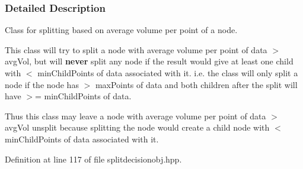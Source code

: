 \subsubsection{\-Detailed \-Description}
\-Class for splitting based on average volume per point of a node. 

\-This class will try to split a node with average volume per point of data $>$ avg\-Vol, but will {\bfseries never} split any node if the result would give at least one child with $<$ min\-Child\-Points of data associated with it. i.\-e. the class will only split a node if the node has $>$ max\-Points of data and both children after the split will have $>$= min\-Child\-Points of data.

\-Thus this class may leave a node with average volume per point of data $>$ avg\-Vol unsplit because splitting the node would create a child node with $<$ min\-Child\-Points of data associated with it. 

\-Definition at line 117 of file splitdecisionobj.\-hpp.



